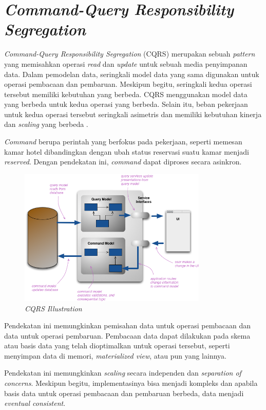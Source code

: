 \section{\textit{Command-Query Responsibility Segregation}}

\textit{Command-Query Responsibility Segregation} (CQRS) merupakan sebuah \textit{pattern} yang memisahkan operasi \textit{read} dan \textit{update} untuk sebuah media penyimpanan data. Dalam pemodelan data, seringkali model data yang sama digunakan untuk operasi pembacaan dan pembaruan. Meskipun begitu, seringkali kedua operasi tersebut memiliki kebutuhan yang berbeda. CQRS menggunakan model data yang berbeda untuk kedua operasi yang berbeda. Selain itu, beban pekerjaan untuk kedua operasi tersebut seringkali asimetris dan memiliki kebutuhan kinerja dan \textit{scaling} yang berbeda \parencite{msCQRS}.

\textit{Command} berupa perintah yang berfokus pada pekerjaan, seperti memesan kamar hotel dibandingkan dengan ubah status reservasi suatu kamar menjadi \textit{reserved}. Dengan pendekatan ini, \textit{command} dapat diproses secara asinkron.

\begin{figure}[ht]
    \centering
    \includegraphics[width=0.8\textwidth]{resources/chapter-2/cqrs.png}
    \caption{\textit{CQRS Illustration} \parencite{fwCQRS}}
    \label{fig:cqrs-illustration}
\end{figure}

Pendekatan ini memungkinkan pemisahan data untuk operasi pembacaan dan data untuk operasi pembaruan. Pembacaan data dapat dilakukan pada skema atau basis data yang telah dioptimalkan untuk operasi tersebut, seperti menyimpan data di memori, \textit{materialized view}, atau pun yang lainnya.

Pendekatan ini memungkinkan \textit{scaling} secara independen dan \textit{separation of concerns}. Meskipun begitu, implementasinya bisa menjadi kompleks dan apabila basis data untuk operasi pembacaan dan pembaruan berbeda, data menjadi \textit{eventual consistent}.